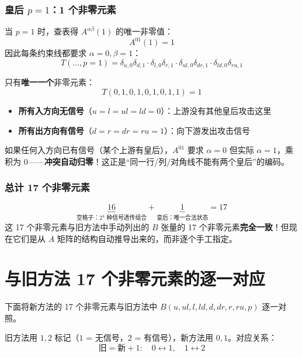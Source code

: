 \documentclass[12pt,a4paper]{article}
\begin{document}
\subsubsection{皇后 $p = 1$：1 个非零元素}

当 $p = 1$ 时，查表得 $A^{\alpha\beta}(1)$ 的唯一非零值：
\[
A^{01}(1) = 1
\]
因此每条约束线都要求 $\alpha = 0, \beta = 1$：
\[
T(\ldots, p=1) = \delta_{u,0}\delta_{d,1} \cdot \delta_{l,0}\delta_{r,1} \cdot \delta_{ul,0}\delta_{dr,1} \cdot \delta_{ld,0}\delta_{ru,1}
\]

只有\textbf{唯一一个}非零元素：
\[
T(0, 1, 0, 1, 0, 1, 0, 1, 1) = 1
\]

\begin{warnbox}[皇后的物理含义]
\begin{itemize}
  \item \textbf{所有入方向无信号}（$u = l = ul = ld = 0$）：上游没有其他皇后攻击这里
  \item \textbf{所有出方向有信号}（$d = r = dr = ru = 1$）：向下游发出攻击信号
\end{itemize}
如果任何入方向已有信号（某个上游有皇后），$A^{01}$ 要求 $\alpha = 0$ 但实际 $\alpha = 1$，乘积为 0——\textbf{冲突自动归零}！这正是``同一行/列/对角线不能有两个皇后''的编码。
\end{warnbox}

\subsubsection{总计 17 个非零元素}

\begin{keybox}[17 = 16 + 1]
\[
\underbrace{16}_{\text{空格子：} 2^4 \text{ 种信号透传组合}} + \underbrace{1}_{\text{皇后：唯一合法状态}} = 17
\]
这 17 个非零元素与旧方法中手动列出的 $B$ 张量的 17 个非零元素\textbf{完全一致}！但现在它们是从 $A$ 矩阵的结构自动推导出来的，而非逐个手工指定。
\end{keybox}

\section{与旧方法 17 个非零元素的逐一对应}

下面将新方法的 17 个非零元素与旧方法中 $B(u, ul, l, ld, d, dr, r, ru, p)$ 逐一对照。

\begin{notebox}[指标对应关系]
旧方法用 $1, 2$ 标记（$1$ = 无信号，$2$ = 有信号），新方法用 $0, 1$。对应关系：
\[
\text{旧} = \text{新} + 1: \quad 0 \leftrightarrow 1, \quad 1 \leftrightarrow 2
\]
\end{notebox}
\end{document}
